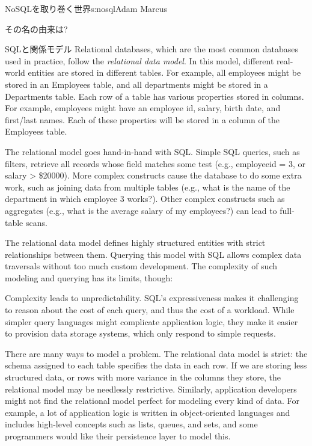 \begin{aosachapter}{NoSQLを取り巻く世界}{s:nosql}{Adam Marcus}
\begin{aosasect1}{その名の由来は?}
\begin{aosasect2}{SQLと関係モデル}
Relational databases, which are the most common databases used in
practice, follow the \emph{relational data model}.  In this model, different
real-world entities are stored in different tables.  For example, all
employees might be stored in an Employees table, and all departments
might be stored in a Departments table.  Each row of a table has
various properties stored in columns.  For example, employees might
have an employee id, salary, birth date, and first/last names.  Each of these properties
will be stored in a column of the Employees table.

The relational model goes hand-in-hand with SQL\@.  Simple SQL queries,
such as filters, retrieve all records whose field matches some test
(e.g., employeeid = 3, or salary > \$20000).  More complex constructs
cause the database to do some extra work, such as joining data from
multiple tables (e.g., what is the name of the department in which
employee 3 works?).  Other complex constructs such as aggregates
(e.g., what is the average salary of my employees?) can lead to
full-table scans.

The relational data model defines highly structured entities with
strict relationships between them.  Querying this model with SQL
allows complex data traversals without too much custom development.
The complexity of such modeling and querying has its limits, though:

\begin{aosaitemize}

  \item Complexity leads to unpredictability.  SQL's expressiveness
  makes it challenging to reason about the cost of each query, and thus the
  cost of a workload.  While simpler query languages might complicate
  application logic, they make it easier to provision data storage
  systems, which only respond to simple requests.

  \item There are many ways to model a problem.  The relational data
  model is strict: the schema assigned to each table specifies the
  data in each row.  If we are storing less structured data, or rows
  with more variance in the columns they store, the relational model
  may be needlessly restrictive.  Similarly, application developers
  might not find the relational model perfect for modeling every kind
  of data.  For example, a lot of application logic is written in
  object-oriented languages and includes high-level concepts such as
  lists, queues, and sets, and some programmers would like their
  persistence layer to model this.


\end{aosaitemize}
\end{aosasect2}
\end{aosasect1}
\end{aosachapter}
